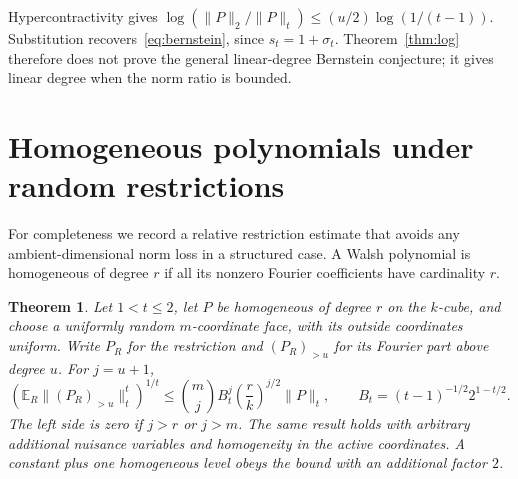 \documentclass[11pt]{article}
\newtheorem{theorem}{Theorem}[section]
\theoremstyle{remark}\newtheorem{remark}[theorem]{Remark}
\newcommand{\E}{\mathbb E}\newcommand{\Prb}{\mathbb P}
\newcommand{\1}{\mathbf 1}\newcommand{\norm}[2]{\lVert #1\rVert_{#2}}
\begin{document}
Hypercontractivity gives $\log(\norm P2/\norm Pt)\le(u/2)\log(1/(t-1))$. Substitution recovers~\eqref{eq:bernstein}, since $s_t=1+\sigma_t$. Theorem~\ref{thm:log} therefore does not prove the general linear-degree Bernstein conjecture; it gives linear degree when the norm ratio is bounded.

\section{Homogeneous polynomials under random restrictions}
For completeness we record a relative restriction estimate that avoids any ambient-dimensional norm loss in a structured case. A Walsh polynomial is homogeneous of degree $r$ if all its nonzero Fourier coefficients have cardinality $r$.

\begin{theorem}\label{thm:homogeneous}
Let $1<t\le2$, let $P$ be homogeneous of degree $r$ on the $k$-cube, and choose a uniformly random $m$-coordinate face, with its outside coordinates uniform. Write $P_R$ for the restriction and $(P_R)_{>u}$ for its Fourier part above degree $u$. For $j=u+1$,
\begin{equation}\label{eq:RR}
 \left(\E_R\norm{(P_R)_{>u}}t^t\right)^{1/t}
 \le \binom mj B_t^j\left(\frac rk\right)^{j/2}\norm Pt,
 \qquad B_t=(t-1)^{-1/2}2^{1-t/2}.
\end{equation}
The left side is zero if $j>r$ or $j>m$. The same result holds with arbitrary additional nuisance variables and homogeneity in the active coordinates. A constant plus one homogeneous level obeys the bound with an additional factor $2$.
\end{theorem}
\end{document}
